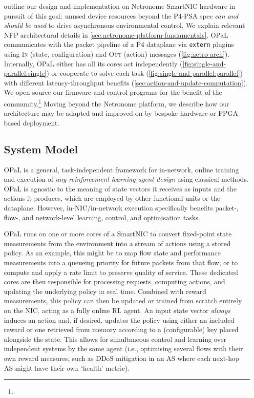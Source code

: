 \documentclass[
sigconf,natbib=false
]{acmart}
\newcommand{\approachshort}{OPaL}
\newcommand{\inring}{\textsc{In}}
\newcommand{\outring}{\textsc{Out}}
\begin{document}
 outline our design and implementation on Netronome SmartNIC hardware in pursuit of this goal: unused device resources beyond the P4-PSA spec \emph{can and should be used} to drive asynchronous environmental control.
We explain relevant NFP architectural details in \cref{sec:netronome-platform-fundamentals}.
\approachshort{} communicates with the packet pipeline of a P4 dataplane via \texttt{extern} plugins using \inring{} (state, configuration) and \outring{} (action) messages (\cref{fig:netro-arch}).
Internally, \approachshort{} either has all its cores act independently (\cref{fig:single-and-parallel:single}) or cooperate to solve each task (\cref{fig:single-and-parallel:parallel})---with different latency-throughput benefits (\cref{sec:action-and-update-computation}).
We open-source our firmware and control programs for the benefit of the community.\footnote{}
Moving beyond the Netronome platform, we describe how our architecture may be adapted and improved on by bespoke hardware or FPGA-based deployment.

\subsection{System Model}
\approachshort{} is a general, task-independent framework for in-network, online training and execution of \emph{any reinforcement learning agent design} using classical methods.
\approachshort{} is agnostic to the meaning of state vectors it receives as inputs and the actions it produces, which are employed by other functional units or the dataplane.
However, in-NIC/in-network execution specifically benefits packet-, flow-, and network-level learning, control, and optimisation tasks.

\approachshort{} runs on one or more cores of a SmartNIC to convert fixed-point state measurements from the environment into a stream of actions using a stored policy.
As an example, this might be to map flow state and performance measurements into a queueing priority for future packets from that flow, or to compute and apply a rate limit to preserve quality of service.
These dedicated cores are then responsible for processing requests, computing actions, and updating the underlying policy in real time.
Combined with reward measurements, this policy can then be updated or trained from scratch entirely on the NIC, acting as a fully online RL agent.
An input state vector \emph{always} induces an action and, if desired, updates the policy using either an included reward or one retrieved from memory according to a (configurable) key placed alongside the state.
This allows for simultaneous control and learning over independent systems by the same agent (i.e., optimising several flows with their own reward measures, such as DDoS mitigation in an AS where each next-hop AS might have their own `health' metric).
\end{document}
